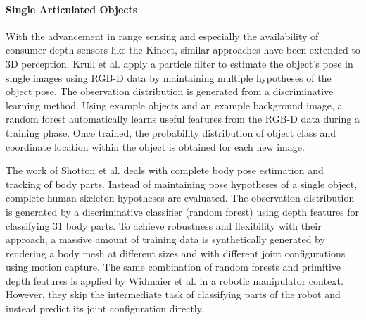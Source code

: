 \paragraph{Single Articulated Objects}
With the advancement in range sensing and especially the availability of consumer depth sensors like the Kinect, similar approaches have been extended to 3D perception. Krull et al. \cite{Krull2015} apply a particle filter to estimate the object's pose in single images using RGB-D data by maintaining multiple hypotheses of the object pose. The observation distribution is generated from a discriminative learning method. Using example objects and an example background image, a random forest automatically learns useful features from the RGB-D data during a training phase. Once trained, the probability distribution of object class and coordinate location within the object is obtained for each new image.

The work of Shotton et al. \cite{Shotton2013} deals with complete body pose estimation and tracking of body parts. Instead of maintaining pose hypotheses of a single object, complete human skeleton hypotheses are evaluated. The observation distribution is generated by a discriminative classifier (random forest) using depth features for classifying 31 body parts. To achieve robustness and flexibility with their approach, a massive amount of training data is synthetically generated by rendering a body mesh at different sizes and with different joint configurations using motion capture.
The same combination of random forests and primitive depth features is applied by Widmaier et al. \cite{Widmaier2016} in a robotic manipulator context. However, they skip the intermediate task of classifying parts of the robot and instead predict its joint configuration directly.

